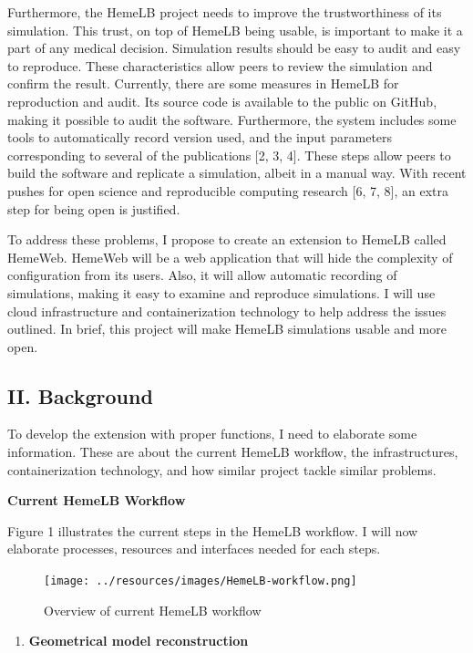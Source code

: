 \documentclass[]{article}
\providecommand{\tightlist}{%
  \setlength{\itemsep}{0pt}\setlength{\parskip}{0pt}}
\begin{document}
Furthermore, the HemeLB project needs to improve the trustworthiness of
its simulation. This trust, on top of HemeLB being usable, is important
to make it a part of any medical decision. Simulation results should be
easy to audit and easy to reproduce. These characteristics allow peers
to review the simulation and confirm the result. Currently, there are
some measures in HemeLB for reproduction and audit. Its source code is
available to the public on GitHub, making it possible to audit the
software. Furthermore, the system includes some tools to automatically
record version used, and the input parameters corresponding to several
of the publications {[}2, 3, 4{]}. These steps allow peers to build the
software and replicate a simulation, albeit in a manual way. With recent
pushes for open science and reproducible computing research {[}6, 7,
8{]}, an extra step for being open is justified.

To address these problems, I propose to create an extension to HemeLB
called HemeWeb. HemeWeb will be a web application that will hide the
complexity of configuration from its users. Also, it will allow
automatic recording of simulations, making it easy to examine and
reproduce simulations. I will use cloud infrastructure and
containerization technology to help address the issues outlined. In
brief, this project will make HemeLB simulations usable and more open.

\subsection{II. Background}\label{ii.-background}

To develop the extension with proper functions, I need to elaborate some
information. These are about the current HemeLB workflow, the
infrastructures, containerization technology, and how similar project
tackle similar problems.

\textbf{Current HemeLB Workflow}

Figure 1 illustrates the current steps in the HemeLB workflow. I will
now elaborate processes, resources and interfaces needed for each steps.

\begin{figure}[H]
\centering
\texttt{[image: ../resources/images/HemeLB-workflow.png]}
\caption{Overview of current HemeLB workflow}
\end{figure}

\begin{enumerate}
\def\labelenumi{\arabic{enumi}.}
\tightlist
\item
  \textbf{Geometrical model reconstruction}
\end{enumerate}
\end{document}

